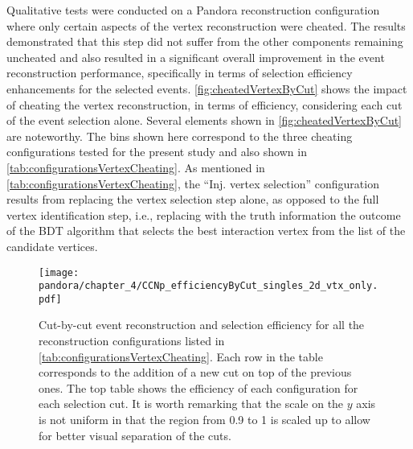 Qualitative tests were conducted on a Pandora reconstruction configuration where only certain aspects of the vertex reconstruction were cheated. The results demonstrated that this step did not suffer from the other components remaining uncheated and also resulted in a significant overall improvement in the event reconstruction performance, specifically in terms of selection efficiency enhancements for the selected events. \autoref{fig:cheatedVertexByCut} shows the impact of cheating the vertex reconstruction, in terms of efficiency, considering each cut of the event selection alone. Several elements shown in \autoref{fig:cheatedVertexByCut} are  noteworthy. The bins shown here correspond to the three cheating configurations tested for the present study and also shown in \autoref{tab:configurationsVertexCheating}. As mentioned in \autoref{tab:configurationsVertexCheating}, the ``Inj. vertex selection'' configuration results from replacing the vertex selection step alone, as opposed to the full vertex identification step, i.e., replacing with the truth information the outcome of the BDT algorithm that selects the best interaction vertex from the list of the candidate vertices. 

\begin{figure}[!htb]
    \centering
    \texttt{[image: pandora/chapter\_4/CCNp\_efficiencyByCut\_singles\_2d\_vtx\_only.pdf]}
    \caption[Event reconstruction and selection efficiency with the cheated vertex creation]{Cut-by-cut event reconstruction and selection efficiency for all the reconstruction configurations listed in \autoref{tab:configurationsVertexCheating}.  Each row in the table corresponds to the addition of a new cut on top of the previous ones. The top table shows the efficiency of each configuration for each selection cut. It is worth remarking that the scale on the $y$ axis is not uniform in that the region from 0.9 to 1 is scaled up to allow for better visual separation of the cuts. }
    \label{fig:cheatedVertexByCut}
\end{figure}


